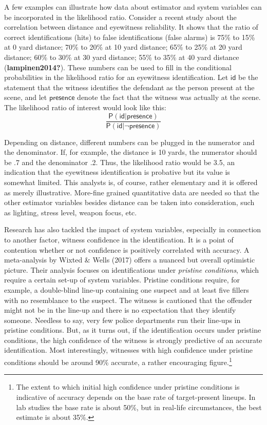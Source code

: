 \documentclass[
  10pt,
  dvipsnames,enabledeprecatedfontcommands]{scrartcl}
\newcommand{\pr}[1]{\mathsf{P}(#1)}
\begin{document}
A few examples can illustrate how data about estimator and system
variables can be incorporated in the likelihood ratio. Consider a recent
study about the correlation between distance and eyewitness reliability.
It shows that the ratio of correct identifications (hits) to false
identifications (false alarms) is 75\% to 15\% at 0 yard distance; 70\%
to 20\% at 10 yard distance; 65\% to 25\% at 20 yard distance; 60\% to
30\% at 30 yard distance; 55\% to 35\% at 40 yard distance
(\textbf{lampinen2014?}). These numbers can be used to fill in the
conditional probabilities in the likelihood ratio for an eyewitness
identification. Let \(\textsf{id}\) be the statement that the witness
identifies the defendant as the person present at the scene, and let
\(\textsf{presence}\) denote the fact that the witness was actually at
the scene. The likelihood ratio of interest would look like this:
\[\frac{\pr{\textsf{id} \vert \textsf{presence}}}{\pr{\textsf{id} \vert \neg \textsf{presence}}}\]

\noindent Depending on distance, different numbers can be plugged in the
numerator and the denominator. If, for example, the distance is 10
yards, the numerator should be .7 and the denominator .2. Thus, the
likelihood ratio would be 3.5, an indication that the eyewitness
identification is probative but its value is somewhat limited. This
analysts is, of course, rather elementary and it is offered as merely
illustrative. More-fine grained quantitative data are needed so that the
other estimator variables besides distance can be taken into
consideration, such as lighting, stress level, weapon focus, etc.

Research has also tackled the impact of system variables, especially in
connection to another factor, witness confidence in the identification.
It is a point of contention whether or not confidence is positively
correlated with accuracy. A meta-analysis by Wixted \& Wells (2017)
offers a nuanced but overall optimistic picture. Their analysis focuses
on identifications under \emph{pristine conditions}, which require a
certain set-up of system variables. Pristine conditions require, for
example, a double-blind line-up containing one suspect and at least five
fillers with no resemblance to the suspect. The witness is cautioned
that the offender might not be in the line-up and there is no
expectation that they identify someone. Needless to say, very few police
departments run their line-ups in pristine conditions. But, as it turns
out, if the identification occurs under pristine conditions, the high
confidence of the witness is strongly predictive of an accurate
identification. Most interestingly, witnesses with high confidence under
pristine conditions should be around 90\% accurate, a rather encouraging
figure.\footnote{The extent to which initial high confidence under
  pristine conditions is indicative of accuracy depends on the base rate
  of target-present lineups. In lab studies the base rate is about 50\%,
  but in real-life circumstances, the best estimate is about 35\%.}
\end{document}
